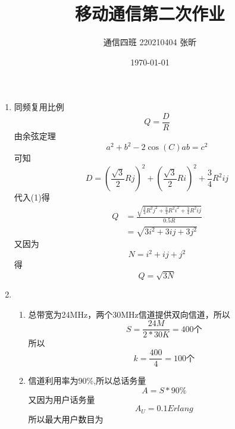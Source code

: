 \documentclass{article}
\title{\zihao{1} 移动通信第二次作业}
\author{通信四班 220210404 张昕}
\date{\today}
\begin{document}
\maketitle
{}
\begin{enumerate}
    \item 同频复用比例
          \begin{equation}
          Q=\frac{D}{R}
          \end{equation}
          由余弦定理
          \begin{equation}
            a^2+b^2-2\cos(C)ab=c^2
          \end{equation}可知
          \begin{equation}
            D=(\frac{\sqrt{3}}{2}Rj)^2+(\frac{\sqrt{3}}{2}Ri)^2+\frac{3}{4}R^2ij
          \end{equation}
          代入(1)得
          \begin{align}
            Q &=\frac{\sqrt{\frac{3}{4}R^{2}j^{2}+\frac{3}{4}R^{2}i^{2}+\frac{3}{4}R^{2}ij}}{0.5R}\\
              &=\sqrt{3i^2+3ij+3j^2}
          \end{align}
          又因为
          \begin{equation}
            N=i^2+ij+j^2
          \end{equation}
          得
          \begin{equation}
            Q=\sqrt{3N}
          \end{equation}
    \item \begin{enumerate}
        \item 总带宽为24MHz，两个30MHz信道提供双向信道，所以
              \begin{equation}
                S=\frac{24M}{2*30K}=400\text{个}
              \end{equation}
              所以
              \begin{equation}
                k=\frac{400}{4}=100\text{个}
              \end{equation}
        \item 信道利用率为90\%,所以总话务量
              \begin{equation}
                A=S*90\%
              \end{equation}
              又因为用户话务量
              \begin{equation}
                A_U=0.1Erlang
              \end{equation} 
              所以最大用户数目为

\end{enumerate}
\end{enumerate}
\end{document}
